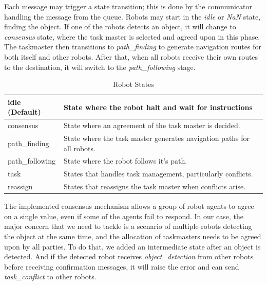 \newpage

Each message may trigger a state transition; this is done by the communicator handling the message from the queue. Robots may start in the \textit{idle} or \textit{NaN} state, finding the object. If one of the robots detects an object, it will change to \textit{consensus} state, where the task master is selected and agreed upon in this phase. The taskmaster then transitions to \textit{path\_finding} to generate navigation routes for both itself and other robots. After that, when all robots receive their own routes to the destination, it will switch to the \textit{path\_following} stage.

\begin{table}[ht]
\centering
\begin{tabular}{|p{3cm}|p{12cm}|}
\hline
 idle (Default) & State where the robot halt and wait for instructions\\ \hline
 consensus & State where an agreement of the task master is decided.\\ \hline
 path\_finding & State where the task master generates navigation paths for all robots.\\ \hline
 path\_following &  State where the robot follows it's path.\\ \hline
 task & States that handles task management, particularly conflicts.\\ \hline
 reassign & States that reassigns the task master when conflicts arise.\\ \hline
\end{tabular}
\caption{Robot States}
\end{table}

The implemented consensus mechanism allows a group of robot agents to agree on a single value, even if some of the agents fail to respond. In our case, the major concern that we need to tackle is a scenario of multiple robots detecting the object at the same time, and the allocation of taskmasters needs to be agreed upon by all parties. To do that, we added an intermediate state after an object is detected. And if the detected robot receives \textit{object\_detection} from other robots before receiving confirmation messages, it will raise the error and can send \textit{task\_conflict} to other robots.

